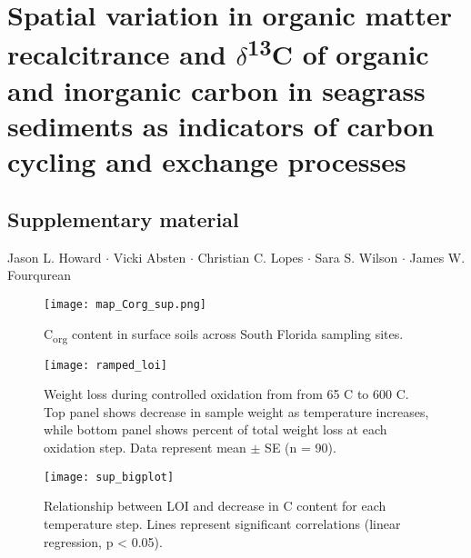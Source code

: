 \section*{Spatial variation in organic matter recalcitrance and $\delta$\textsuperscript{13}C of organic and inorganic carbon in seagrass sediments as indicators of carbon cycling and exchange processes}


\subsection*{Supplementary material \bigskip}
Jason L. Howard $\cdot$ Vicki Absten $\cdot$ Christian C. Lopes $\cdot$ Sara S. Wilson $\cdot$ James W. Fourqurean



\bigskip
\bigskip

\begin{figure}[h]
  \centering
   \texttt{[image: map\_Corg\_sup.png]}
\caption{C\textsubscript{org} content in surface soils across South Florida sampling sites.}
  \label{Online Resource:2F0}
\end{figure}


\begin{figure}[h]
  \centering
   \texttt{[image: ramped\_loi]}
\caption{Weight loss during controlled oxidation from from 65 \textdegree C to 600 \textdegree C. Top panel shows decrease in sample weight as temperature increases, while bottom panel shows percent of total weight loss at each oxidation step. Data represent mean $\pm$ SE (n = 90).}
  \label{Online Resource:2F1}
\end{figure}



\begin{figure}[h]
  \centering
  \texttt{[image: sup\_bigplot]}
\caption{Relationship between LOI and decrease in C content for each temperature step. Lines represent significant correlations (linear regression, p < 0.05).}
  \label{fig:2F2}
\end{figure}

\clearpage







